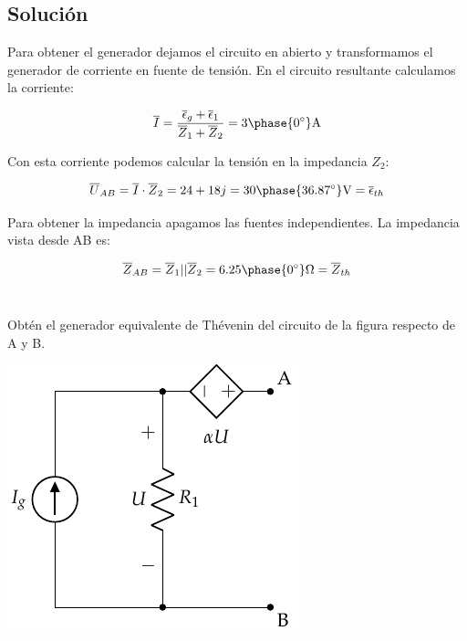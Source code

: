 \documentclass[12pt]{article}
\begin{document}
\noindent\hrulefill

\subsection*{Solución}

Para obtener el generador dejamos el circuito en abierto y transformamos el generador de corriente en fuente de tensión. En el circuito resultante calculamos la corriente:

\begin{equation*}
  \overline{I} = \frac{\overline{\epsilon}_g + \overline{\epsilon}_1}{\overline{Z}_1 + \overline{Z}_2} = 3\phase{\ang{0}}\si{\ampere} 
\end{equation*}

Con esta corriente podemos calcular la tensión en la impedancia $Z_2$:

\begin{equation*}
  \overline{U}_{AB} = \overline{I} \cdot \overline{Z}_2 = 24 + 18j = 30\phase{\ang{36.87}}\si{\volt} = \overline{\epsilon}_{th}
\end{equation*}

Para obtener la impedancia apagamos las fuentes independientes. La impedancia vista desde AB es:

\begin{equation*}
  \overline{Z}_{AB} = \overline{Z}_1 || \overline{Z}_2 = 6.25\phase{\ang{0}}\si{\ohm} = \overline{Z}_{th}
\end{equation*}


\clearpage

\section{}

Obtén el generador equivalente de Thévenin del circuito de la figura respecto de A y B.
\begin{center}
\includegraphics{figs/Thevenin1}
\end{center}
\end{document}
